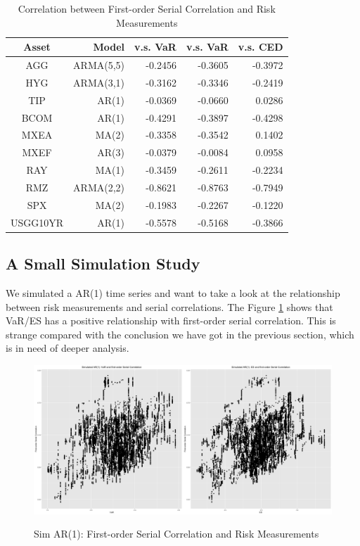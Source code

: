 \documentclass[12pt]{article}
\begin{document}
\begin{table}[!h]
\caption{Correlation between First-order Serial Correlation and Risk Measurements}
\centering 
\begin{tabular}{ | c || r | r | r | r |} 
 \hline
Asset& Model & v.s. VaR & v.s. VaR &v.s. CED\\
  \hline \hline
AGG &ARMA(5,5) &-0.2456 &  -0.3605&-0.3972 \\ 
HYG &ARMA(3,1) & -0.3162& -0.3346 & -0.2419 \\ 
TIP & AR(1)  &-0.0369 & -0.0660 & 0.0286 \\ 
BCOM &AR(1) & -0.4291&  -0.3897& -0.4298\\ 
MXEA & MA(2) &-0.3358&  -0.3542& 0.1402\\ 
MXEF & AR(3)  &-0.0379  &  -0.0084& 0.0958\\ 
RAY & MA(1) &-0.3459 &   -0.2611&  -0.2234\\ 
RMZ & ARMA(2,2) &-0.8621 &  -0.8763&  -0.7949\\ 
SPX & MA(2)  &-0.1983 &  -0.2267& -0.1220\\ 
USGG10YR &  AR(1) &-0.5578&  -0.5168& -0.3866\\
 \hline
\end{tabular}
\label{table:vsRiskMeasure}
\end{table}

\subsection{A Small Simulation Study}
We simulated a AR(1) time series and want to take a look at the relationship between risk measurements and serial correlations. The Figure \ref{fig:SimPart2} shows that VaR/ES has a positive relationship with first-order serial correlation. This is strange compared with the conclusion we have got in the previous section, which is in need of deeper analysis.
\begin{figure}
  \caption{Sim AR(1): First-order Serial Correlation and Risk Measurements}
  \includegraphics[width = \textwidth]{../figures/sim_part2}
  \label{fig:SimPart2}
\end{figure}
\end{document}
